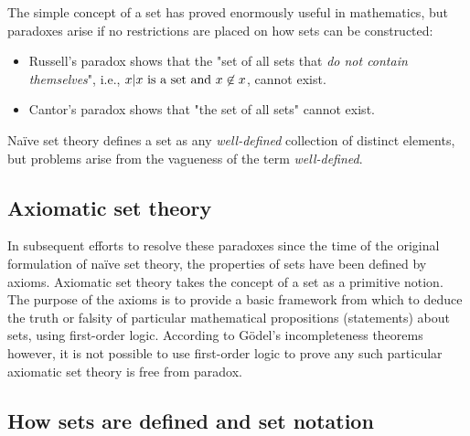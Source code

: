 The simple concept of a set has proved enormously useful in mathematics, but paradoxes
arise if no restrictions are placed on how sets can be constructed:



\begin{itemize}
    \item Russell's paradox shows that the "set of all sets that \textit{do not contain themselves}", i.e., $\\{ x | x \text{ is a set and } x \not \in x\\}$, cannot exist.
    \item Cantor's paradox shows that "the set of all sets" cannot exist.
\end{itemize}

Naïve set theory defines a set as any \textit{well-defined} collection of distinct
elements, but problems arise from the vagueness of the term \textit{well-defined}.




\subsection{Axiomatic set theory}
\label{sss:axio-03f6}




In subsequent efforts to resolve these paradoxes since the time of the original
formulation of naïve set theory, the properties of sets have been defined by axioms.
Axiomatic set theory takes the concept of a set as a primitive notion. The purpose of the
axioms is to provide a basic framework from which to deduce the truth or falsity of
particular mathematical propositions (statements) about sets, using first-order logic.
According to Gödel's incompleteness theorems however, it is not possible to use
first-order logic to prove any such particular axiomatic set theory is free from paradox.




\subsection{How sets are defined and set notation}
\label{sss:hows-78ca}




